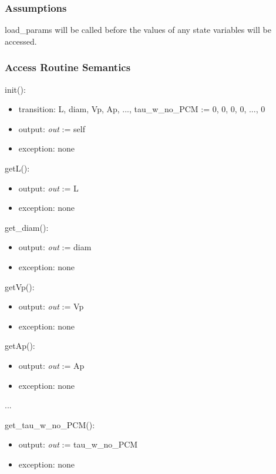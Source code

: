 \documentclass[12pt]{article}
\begin{document}
\subsubsection{Assumptions}

load\_params will be called before the values of any state variables will be accessed.

\subsubsection{Access Routine Semantics}

\noindent init():
\begin{itemize}
\item transition: L, diam,  Vp, Ap, ..., tau\_w\_no\_PCM := 0, 0, 0, 0, ..., 0
\item output: \textit{out} := self
\item exception: none
\end{itemize}

\noindent getL():
\begin{itemize}
\item output: \textit{out} := L
\item exception: none
\end{itemize}

\noindent get\_diam():
\begin{itemize}
\item output: \textit{out} := diam
\item exception: none
\end{itemize}

\noindent getVp():
\begin{itemize}
\item output: \textit{out} := Vp
\item exception: none
\end{itemize}

\noindent getAp():
\begin{itemize}
\item output: \textit{out} := Ap
\item exception: none
\end{itemize}

...

\noindent get\_tau\_w\_no\_PCM():
\begin{itemize}
\item output: \textit{out} := tau\_w\_no\_PCM
\item exception: none
\end{itemize}
\end{document}
